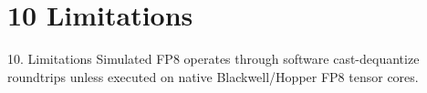 \section{10 Limitations}

 10. Limitations
Simulated FP8 operates through software cast-dequantize roundtrips unless executed on native Blackwell/Hopper FP8 tensor cores.

